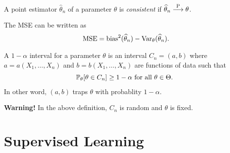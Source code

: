 \documentclass[a4paper]{article}
\begin{document}
\begin{defi}
  A point estimator $\hat\theta_n$ of a parameter
  $\theta$ is \emph{consistent} if $\hat{\theta}_n 
  \convProb \theta$.
\end{defi}

\begin{thm}
The MSE can be written as 
\[
\mse = \bias^2 (\hat{\theta}_n) - \var_\theta (\hat{\theta}_n).
\]
\end{thm}

\begin{defi}
  A $1 - \alpha$ interval for a parameter $\theta$ is 
  an interval $C_n = (a, b)$ where 
  $a = a(X_1, \dots, X_n)$ and $b = b(X_1, \dots, X_n)$
  are functions of data such that 
  \[
  \P_\theta[\theta \in C_n] \geq 1 - \alpha 
  \text{ for all $\theta \in \Theta$. }
  \]
  In other word, $(a, b)$ traps $\theta$ with probablity 
  $1 - \alpha$. 
\end{defi}

\textbf{Warning!} In the above definition, 
$C_n$ is random and $\theta$ is fixed.

\section{Supervised Learning}
\end{document}

